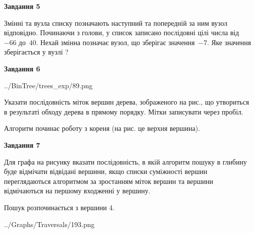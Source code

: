 \documentclass[12pt, ukrainian]{article}
\begin{document}
{\begin {large}
{\begin {center}\textbf{Завдання 5}\end {center}}\par
Змінні  та  вузла списку позначають наступний та попередній за ним вузол відповідно. Починаючи з голови, у список записано послідовні цілі числа від~$-66$ до~$40$. Нехай змінна  позначає вузол, що зберігає значення~$-7$.
Яке значення зберігається у вузлі  ?\par
\newpage

{\begin {center}\textbf{Завдання 6}\end {center}}\par

\begin{center}
	{../BinTree/trees_exp/89.png}
\end{center}
Указати послідовність міток вершин дерева, зображеного на рис., що утвориться в результаті обходу дерева в прямому порядку. Мітки записувати через пробіл.\par Алгоритм починає роботу з кореня (на рис. це верхня вершина).\par
\newpage

{\begin {center}\textbf{Завдання 7}\end {center}}\par
Для графа на рисунку вказати послідовність, в якій алгоритм пошуку в глибину буде відмічати відвідані вершини, якщо списки суміжності вершин переглядаються алгоритмом за зростанням міток вершин та вершини відмічаються на першому вход\-женні у вершину.\par
Пошук розпочинається з вершини 4.\par

\begin{center}
	{../Graphs/Traversals/193.png}
\end{center}\par
\newpage


\end{large}}
\end{document}
